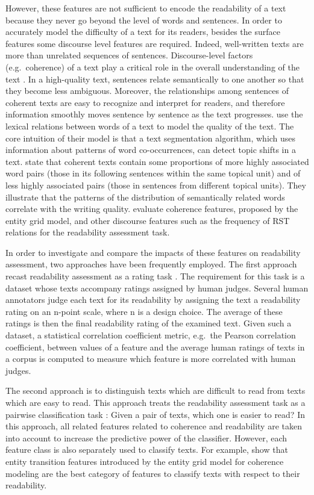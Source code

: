 However, these features are not sufficient to encode the readability of a text because they never go beyond the level of words and sentences. 
In order to accurately model the difficulty of a text for its readers, besides the surface features some discourse level features are required. 
Indeed, well-written texts are more than unrelated sequences of sentences. 
Discourse-level factors (e.g.\ coherence) of a text play a critical role in the overall understanding of the text \cite{pitler08}.  
In a high-quality text, sentences relate semantically to one another so that they become less ambiguous.   
Moreover, the relationships among sentences of coherent texts are easy to recognize and interpret for readers, and therefore information smoothly moves sentence by sentence as the text progresses. 
 use the lexical relations between words of a text to model the quality of the text. 
The core intuition of their model is that a text segmentation algorithm, which uses information about patterns of word co-occurrences, can detect topic shifts in a text. 
 state that coherent texts contain some proportions of more highly associated word pairs (those in its following sentences within the same topical unit) and of less highly associated pairs (those in sentences from different topical units).  
They illustrate that the patterns of the distribution of semantically related words correlate with the writing quality. 
 evaluate coherence features, proposed by the entity grid model, and other discourse features such as the frequency of RST relations for the readability assessment task. 

In order to investigate and compare the impacts of these features on readability assessment, two approaches have been frequently employed. 
The first approach recast readability assessment as a rating task \cite{pitler08,kate10}. 
The requirement for this task is a dataset whose texts accompany ratings assigned by human judges. 
Several human annotators judge each text for its readability by assigning the text a readability rating on an n-point scale, where n is a design choice. 
The average of these ratings is then the final readability rating of the examined text.  
Given such a dataset, a statistical correlation coefficient metric, e.g.\ the Pearson correlation coefficient, between values of a feature and the average human ratings of texts in a corpus is computed to measure which feature is more correlated with human judges.  

The second approach is to distinguish texts which are difficult to read from texts which are easy to read. 
This approach treats the readability assessment task as a pairwise classification task \cite{pitler08,guinaudeau13,barzilay08}: Given a pair of texts, which one is easier to read? 
In this approach, all related features related to coherence and readability are taken into account to increase the predictive power of the classifier. 
However, each feature class is also separately used to classify texts.   
For example,  show that entity transition features introduced by the entity grid model for coherence modeling are the best category of features to classify texts with respect to their readability. 


